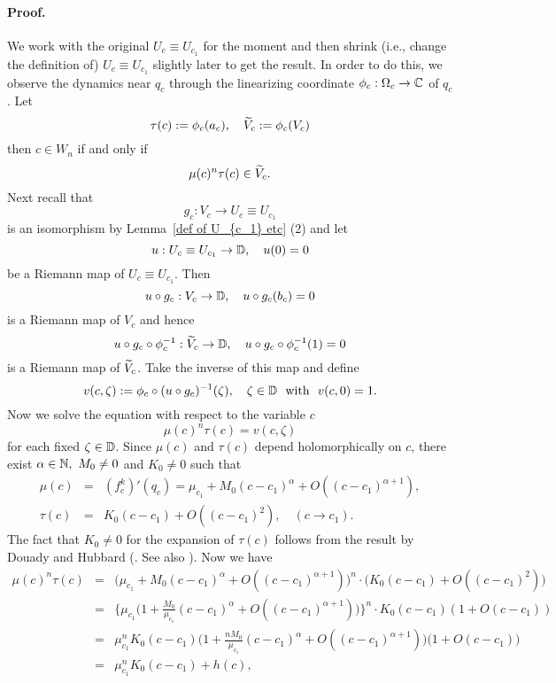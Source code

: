 \paragraph{\bf Proof.}
We work with the original $U_c \equiv U_{c_1}$ for the moment and then
shrink (i.e., change the definition of) $U_c \equiv U_{c_1}$ slightly
later to get the result.
In order to do this, 
we observe the dynamics near $q_c$ through the linearizing coordinate 
$\phi_c : \Omega_c \to \mathbb C$ of $q_c$. Let
$$
  \tau(c) := \phi_c(a_c), \quad \widetilde{V}_c := \phi_c(V_c)
$$
then $c \in W_n$ if and only if 
$$
  \mu(c)^n \tau(c) \in \widetilde{V}_c.
$$
Next recall that
$$
  g_c : V_c \to U_c \equiv U_{c_1}
$$
is an isomorphism by Lemma~\ref{def of U_{c_1} etc} (2) and let
$$
  u : U_c \equiv U_{c_1} \to \mathbb D, \quad u(0) = 0
$$
be a Riemann map of $U_c \equiv U_{c_1}$. Then
$$
  u \circ g_c : V_c \to \mathbb D, \quad u \circ g_c(b_c)=0
$$
is a Riemann map of $V_c$ and hence
$$
  u \circ g_c \circ \phi_c^{-1} : \widetilde{V}_c \to \mathbb D, \quad 
  u \circ g_c \circ \phi_c^{-1}(1) = 0
$$
is a Riemann map of $\widetilde{V}_c$. Take the inverse of this map and define
$$
  v(c, \zeta) := \phi_c \circ (u \circ g_c)^{-1}(\zeta), \quad 
  \zeta \in \mathbb D \ \text{ with } \ v(c, 0)=1.
$$
Now we solve the equation with respect to the variable $c$
\begin{equation}
  \mu(c)^n \tau(c) = v(c,\zeta)
\label{eqn for v(c,zeta)}
\end{equation}
for each fixed $\zeta \in \mathbb D$. 
Since $\mu(c)$ and $\tau(c)$ depend holomorphically on $c$, 
there exist $\alpha \in \mathbb N, \ M_0 \ne 0$ and $K_0 \ne 0$ such that
\begin{eqnarray*}
  \mu(c) 
& = &
(f_c^k)'(q_c) = \mu_{c_1} + M_0(c-c_1)^\alpha + O((c-c_1)^{\alpha+1}),  \\
\tau(c) 
& = &
K_0(c-c_1) + O((c-c_1)^2), \quad (c \to c_1).
\end{eqnarray*}
The fact that $K_0 \ne 0$ for the expansion of $\tau(c)$ follows from the 
result by Douady and Hubbard
(\cite[p.333, Lemma 1]{Douady-Hubbard 1985}. See also 
\cite[p.609, Lemma 5.4]{Tan Lei 1990}). 
Now we have
\begin{eqnarray*}
\mu(c)^n \tau(c)
& = &
\big( \mu_{c_1} + M_0(c-c_1)^\alpha + O((c-c_1)^{\alpha+1}) \big)^n 
\cdot \big( K_0(c-c_1) + O((c-c_1)^2) \big) \\
& = & 
\bigg\{ 
  \mu_{c_1}\Big(1 + \frac{M_0}{\mu_{c_1}}(c-c_1)^\alpha + O((c-c_1)^{\alpha+1}) \Big)
\bigg\}^n
\cdot K_0(c-c_1)(1+ O(c-c_1)) \\
& = & 
\mu_{c_1}^nK_0(c-c_1) 
\bigg( 1 + \frac{nM_0}{\mu_{c_1}}(c-c_1)^\alpha + O((c-c_1)^{\alpha+1}) \bigg)
\big( 1+ O(c-c_1) \big) \\
& = & 
\mu_{c_1}^nK_0(c-c_1) + h(c), 
\end{eqnarray*}
